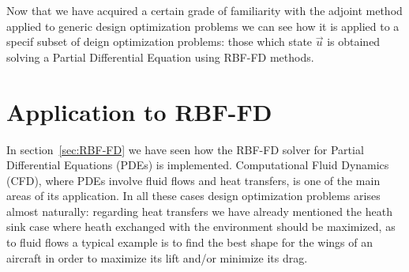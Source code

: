 Now that we have acquired a certain grade of familiarity with the adjoint method applied to generic design optimization problems we can see how it is applied to a specif subset of deign optimization problems: those which state $\vec{u}$ is obtained solving a Partial Differential Equation using RBF-FD methods.

\section{Application to RBF-FD}

In section~\vref{sec:RBF-FD} we have seen how the RBF-FD solver for Partial Differential Equations (PDEs) is implemented. Computational Fluid Dynamics (CFD), where PDEs involve fluid flows and heat transfers, is one of the main areas of its application. In all these cases design optimization problems arises almost naturally: regarding heat transfers we have already mentioned the heath sink case where heath exchanged with the environment should be maximized, as to fluid flows a typical example is to find the best shape for the wings of an aircraft in order to maximize its lift and/or minimize its drag.


